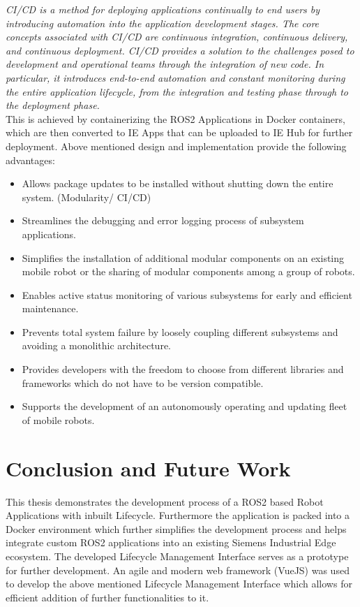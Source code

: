 \textit{
CI/CD is a method for deploying applications continually to end users by introducing automation into the application development stages. The core concepts associated with CI/CD are continuous integration, continuous delivery, and continuous deployment. CI/CD provides a solution to the challenges posed to development and operational teams through the integration of new code. In particular, it introduces end-to-end automation and constant monitoring during the entire application lifecycle, from the integration and testing phase through to the deployment phase.\cite*{cicdOverwiew}}
\\

This is achieved by containerizing the ROS2 Applications in Docker containers, which are then converted to IE Apps that can be uploaded to IE Hub for further deployment. Above mentioned design and implementation provide the following advantages:


\begin{itemize}
	\item 	Allows package updates to be installed without shutting down the entire system. (Modularity/ CI/CD)
	\item 	Streamlines the debugging and error logging process of subsystem applications.
	\item 	Simplifies the installation of additional modular components on an existing mobile robot or the sharing of modular components among a group of robots.
	\item 	Enables active status monitoring of various subsystems for early and efficient maintenance.
	\item 	Prevents total system failure by loosely coupling different subsystems and avoiding a monolithic architecture.
	\item 	Provides developers with the freedom to choose from different libraries and frameworks which do not have to be version compatible.
	\item 	Supports the development of an autonomously operating and updating fleet of mobile robots.
\end{itemize}

\chapter{Conclusion and Future Work}
\label{: Conclusion and Future Work}
	This thesis demonstrates the development process of a ROS2 based Robot Applications with inbuilt Lifecycle. Furthermore the application is packed into a Docker environment which further simplifies the development process and helps integrate custom ROS2 applications into an existing Siemens Industrial Edge ecosystem. The developed Lifecycle Management Interface serves as a prototype for further development. An agile and modern web framework (VueJS) was used to develop the above mentioned Lifecycle Management Interface which allows for efficient addition of further functionalities to it.  
    \\
	
